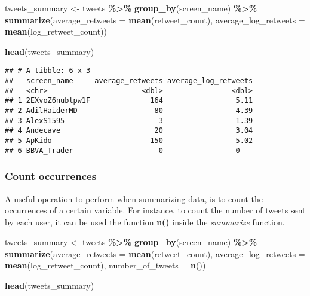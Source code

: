 \documentclass[
]{article}
\newenvironment{Shaded}{\begin{snugshade}}{\end{snugshade}}
\newcommand{\AttributeTok}[1]{\textcolor[rgb]{0.13,0.29,0.53}{#1}}
\newcommand{\FunctionTok}[1]{\textcolor[rgb]{0.13,0.29,0.53}{\textbf{#1}}}
\newcommand{\NormalTok}[1]{#1}
\newcommand{\OtherTok}[1]{\textcolor[rgb]{0.56,0.35,0.01}{#1}}
\newcommand{\SpecialCharTok}[1]{\textcolor[rgb]{0.81,0.36,0.00}{\textbf{#1}}}
\begin{document}
\begin{Shaded}
\begin{Highlighting}[]
\NormalTok{tweets\_summary }\OtherTok{\textless{}{-}}\NormalTok{ tweets }\SpecialCharTok{\%\textgreater{}\%}
  \FunctionTok{group\_by}\NormalTok{(screen\_name) }\SpecialCharTok{\%\textgreater{}\%}
  \FunctionTok{summarize}\NormalTok{(}\AttributeTok{average\_retweets =} \FunctionTok{mean}\NormalTok{(retweet\_count),}
            \AttributeTok{average\_log\_retweets =} \FunctionTok{mean}\NormalTok{(log\_retweet\_count))}

\FunctionTok{head}\NormalTok{(tweets\_summary)}
\end{Highlighting}
\end{Shaded}

\begin{verbatim}
## # A tibble: 6 x 3
##   screen_name     average_retweets average_log_retweets
##   <chr>                      <dbl>                <dbl>
## 1 2EXvoZ6nublpw1F              164                 5.11
## 2 AdilHaiderMD                  80                 4.39
## 3 AlexS1595                      3                 1.39
## 4 Andecave                      20                 3.04
## 5 ApKido                       150                 5.02
## 6 BBVA_Trader                    0                 0
\end{verbatim}

\subsubsection{Count occurrences}\label{count-occurrences}

A useful operation to perform when summarizing data, is to count the occurrences of a certain variable. For instance, to count the number of tweets sent by each user, it can be used the function \textbf{n()} inside the \emph{summarize} function.

\begin{Shaded}
\begin{Highlighting}[]
\NormalTok{tweets\_summary }\OtherTok{\textless{}{-}}\NormalTok{ tweets }\SpecialCharTok{\%\textgreater{}\%}
  \FunctionTok{group\_by}\NormalTok{(screen\_name) }\SpecialCharTok{\%\textgreater{}\%}
  \FunctionTok{summarize}\NormalTok{(}\AttributeTok{average\_retweets =} \FunctionTok{mean}\NormalTok{(retweet\_count),}
            \AttributeTok{average\_log\_retweets =} \FunctionTok{mean}\NormalTok{(log\_retweet\_count),}
            \AttributeTok{number\_of\_tweets =} \FunctionTok{n}\NormalTok{())}

\FunctionTok{head}\NormalTok{(tweets\_summary)}
\end{Highlighting}
\end{Shaded}
\end{document}
